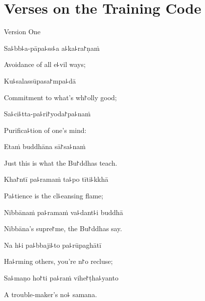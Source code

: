 \chapter{Verses on the Training Code}%


\begin{leader}
\end{leader}

\begin{instruction}
  Version One
\end{instruction}

Sa꜕bb꜕a-pāpa꜕ss꜕a a꜕ka꜕ra꜓ṇaṁ

\begin{english}
  Avoidance of all e꜕vil ways;
\end{english}

Ku꜕salassūpasa꜓mpa꜕dā

\begin{english}
  Commitment to what's wh꜓olly good;
\end{english}

Sa꜕ci꜕tta-pa꜕ri꜓yoda꜓pa꜕naṁ

\begin{english}
  Purifica꜕tion of one's mind:
\end{english}

Etaṁ buddhāna sā꜓sa꜕naṁ

\begin{english}
  Just this is what the Bu꜓ddhas teach.
\end{english}

Kha꜓ntī pa꜕ramaṁ ta꜕po tīti꜕kkhā

\begin{english}
  Pa꜕tience is the cl꜕eansing flame;
\end{english}

Nibbānaṁ pa꜕ramaṁ va꜕dant꜕i buddhā

\begin{english}
  Nibbāna's supre꜓me, the Bu꜓ddhas say.
\end{english}

Na h꜕i pa꜕bbaji꜕to pa꜕rūpaghātī

\begin{english}
  Ha꜕rming others, you're n꜓o recluse;
\end{english}

Sa꜕maṇo ho꜓ti pa꜕raṁ vihe꜓ṭha꜕yanto

\begin{english}
  A trouble-maker's no꜕ samana.
\end{english}

